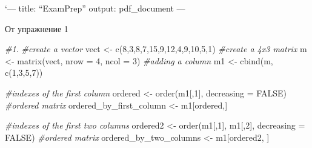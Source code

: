 \documentclass[
]{article}
\author{}
\date{\vspace{-2.5em}}
\newenvironment{Shaded}{\begin{snugshade}}{\end{snugshade}}
\newcommand{\AttributeTok}[1]{\textcolor[rgb]{0.77,0.63,0.00}{#1}}
\newcommand{\CommentTok}[1]{\textcolor[rgb]{0.56,0.35,0.01}{\textit{#1}}}
\newcommand{\ConstantTok}[1]{\textcolor[rgb]{0.00,0.00,0.00}{#1}}
\newcommand{\DecValTok}[1]{\textcolor[rgb]{0.00,0.00,0.81}{#1}}
\newcommand{\FunctionTok}[1]{\textcolor[rgb]{0.00,0.00,0.00}{#1}}
\newcommand{\NormalTok}[1]{#1}
\newcommand{\OtherTok}[1]{\textcolor[rgb]{0.56,0.35,0.01}{#1}}
\newcommand{\SpecialCharTok}[1]{\textcolor[rgb]{0.00,0.00,0.00}{#1}}
\begin{document}
`--- title: ``ExamPrep'' output: pdf\_document ---

От упражнение 1

\begin{Shaded}
\begin{Highlighting}[]
\CommentTok{\#1.}
\CommentTok{\#create a vector}
\NormalTok{vect }\OtherTok{\textless{}{-}} \FunctionTok{c}\NormalTok{(}\DecValTok{8}\NormalTok{,}\DecValTok{3}\NormalTok{,}\DecValTok{8}\NormalTok{,}\DecValTok{7}\NormalTok{,}\DecValTok{15}\NormalTok{,}\DecValTok{9}\NormalTok{,}\DecValTok{12}\NormalTok{,}\DecValTok{4}\NormalTok{,}\DecValTok{9}\NormalTok{,}\DecValTok{10}\NormalTok{,}\DecValTok{5}\NormalTok{,}\DecValTok{1}\NormalTok{)}
\CommentTok{\#create a 4x3 matrix}
\NormalTok{m }\OtherTok{\textless{}{-}} \FunctionTok{matrix}\NormalTok{(vect, }\AttributeTok{nrow =} \DecValTok{4}\NormalTok{, }\AttributeTok{ncol =} \DecValTok{3}\NormalTok{)}
\CommentTok{\#adding a column}
\NormalTok{m1 }\OtherTok{\textless{}{-}} \FunctionTok{cbind}\NormalTok{(m, }\FunctionTok{c}\NormalTok{(}\DecValTok{1}\NormalTok{,}\DecValTok{3}\NormalTok{,}\DecValTok{5}\NormalTok{,}\DecValTok{7}\NormalTok{))}

\CommentTok{\#indexes of the first column}
\NormalTok{ordered }\OtherTok{\textless{}{-}} \FunctionTok{order}\NormalTok{(m1[,}\DecValTok{1}\NormalTok{], }\AttributeTok{decreasing =} \ConstantTok{FALSE}\NormalTok{)}
\CommentTok{\#ordered matrix}
\NormalTok{ordered\_by\_first\_column }\OtherTok{\textless{}{-}}\NormalTok{ m1[ordered,]}

\CommentTok{\#indexes of the first two columns}
\NormalTok{ordered2 }\OtherTok{\textless{}{-}} \FunctionTok{order}\NormalTok{(m1[,}\DecValTok{1}\NormalTok{], m1[,}\DecValTok{2}\NormalTok{], }\AttributeTok{decreasing =} \ConstantTok{FALSE}\NormalTok{)}
\CommentTok{\#ordered matrix}
\NormalTok{ordered\_by\_two\_columns }\OtherTok{\textless{}{-}}\NormalTok{ m1[ordered2, ]}
\end{Highlighting}
\end{Shaded}

\begin{Shaded}
\end{Shaded}
\end{document}
